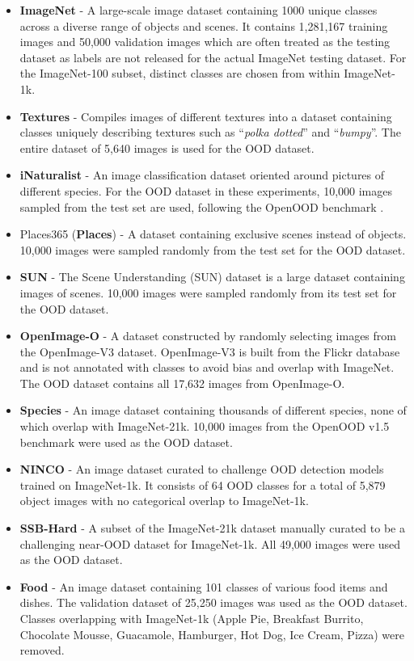 \begin{itemize}
	\item \textbf{ImageNet} \cite{krizhevsky2012imagenet} - A large-scale image dataset containing 1000 unique classes across a diverse range of objects and scenes. It contains 1,281,167 training images and 50,000 validation images which are often treated as the testing dataset as labels are not released for the actual ImageNet testing dataset. For the ImageNet-100 subset, distinct classes are chosen from within ImageNet-1k.
	\item \textbf{Textures} \cite{cimpoi2014describing} - Compiles images of different textures into a dataset containing classes uniquely describing textures such as ``\textit{polka dotted}'' and ``\textit{bumpy}''. The entire dataset of 5,640 images is used for the OOD dataset.
	\item \textbf{iNaturalist} \cite{van2018inaturalist} - An image classification dataset oriented around pictures of different species. For the OOD dataset in these experiments, 10,000 images sampled from the test set are used, following the OpenOOD benchmark \cite{yang2022openood}.
	\item Places365 (\textbf{Places}) \cite{zhou2017places} - A dataset containing exclusive scenes instead of objects. 10,000 images were sampled randomly from the test set for the OOD dataset.
	\item \textbf{SUN} \cite{xiao2010sun,huang2021mos} - The Scene Understanding (SUN) dataset is a large dataset containing images of scenes. 10,000 images were sampled randomly from its test set for the OOD dataset. 
	\item \textbf{OpenImage-O} \cite{wang2022vim} - A dataset constructed by randomly selecting images from the OpenImage-V3 dataset. OpenImage-V3 is built from the Flickr database and is not annotated with classes to avoid bias and overlap with ImageNet. The OOD dataset contains all 17,632 images from OpenImage-O.
	\item \textbf{Species} \cite{hendrycks2019scaling} - An image dataset containing thousands of different species, none of which overlap with ImageNet-21k. 10,000 images from the OpenOOD v1.5 benchmark \cite{zhang2023openood} were used as the OOD dataset.
	\item \textbf{NINCO} \cite{bitterwolf2023or} - An image dataset curated to challenge OOD detection models trained on ImageNet-1k. It consists of 64 OOD classes for a total of 5,879 object images with no categorical overlap to ImageNet-1k.
	\item \textbf{SSB-Hard} \cite{vaze2021open} - A subset of the ImageNet-21k \cite{ridnik2021imagenet} dataset manually curated to be a challenging near-OOD dataset for ImageNet-1k. All 49,000 images were used as the OOD dataset.
    \item \textbf{Food} \cite{bossard2014food} - An image dataset containing 101 classes of various food items and dishes. The validation dataset of 25,250 images was used as the OOD dataset. Classes overlapping with ImageNet-1k (Apple Pie, Breakfast Burrito, Chocolate Mousse, Guacamole, Hamburger, Hot Dog, Ice Cream, Pizza) were removed.
\end{itemize}
